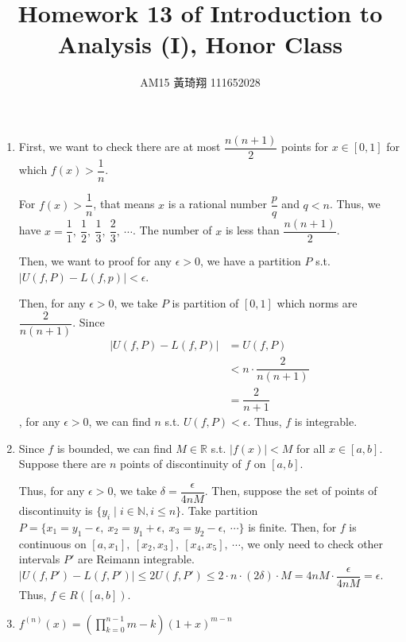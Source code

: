\documentclass[12pt]{article}
\title{Homework 13 of Introduction to Analysis (I), Honor Class}
\author{AM15 黃琦翔 111652028}
\begin{document}
\maketitle
\begin{enumerate}
    \item First, we want to check there are at most $\dfrac{n(n+1)}{2}$ points for $x\in [0, 1]$ for which $f(x) > \dfrac{1}{n}$.
    
    For $f(x) > \dfrac{1}{n}$, that means $x$ is a rational number $\dfrac{p}{q}$ and $q < n$.
    Thus, we have $x = \dfrac{1}{1},\ \dfrac{1}{2},\ \dfrac{1}{3},\ \dfrac{2}{3},\ \cdots$.
    The number of $x$ is less than $\dfrac{n(n+1)}{2}$.

    Then, we want to proof for any $\epsilon > 0$, we have a partition $P$ s.t. $|U(f, P) - L(f, p)| < \epsilon$.

    Then, for any $\epsilon > 0$, we take $P$ is partition of $[0, 1]$ which norms are $\dfrac{2}{n(n+1)}$.
    Since \begin{align*}
        |U(f, P) - L(f, P)| &= U(f, P)\\
        &< n \cdot \dfrac{2}{n(n+1)}\\
        &= \dfrac{2}{n+1}
    \end{align*}
    , for any $\epsilon > 0$, we can find $n$ s.t. $U(f, P) < \epsilon$.
    Thus, $f$ is integrable.


    \item Since $f$ is bounded, we can find $M\in \mathbb{R}$ s.t. $|f(x)| < M$ for all $x\in [a, b]$.
    Suppose there are $n$ points of discontinuity of $f$ on $[a, b]$.
    
    Thus, for any $\epsilon > 0$, we take $\delta = \dfrac{\epsilon}{4nM}$.
    Then, suppose the set of points of discontinuity is $\lbrace y_i\mid i \in \mathbb{N}, i \leq n\rbrace$.
    Take partition $P = \lbrace x_1 = y_1 - \epsilon,\ x_2 = y_1 + \epsilon,\ x_3 = y_2-\epsilon,\ \cdots\rbrace$ is finite.
    Then, for $f$ is continuous on $[a, x_1],\ [x_2, x_3],\ [x_4, x_5],\ \cdots$, 
    we only need to check other intervals $P'$ are Reimann integrable.
    $|U(f, P') - L(f, P')| \leq 2U(f, P') \leq 2\cdot n \cdot  (2\delta) \cdot M = 4nM \cdot \dfrac{\epsilon}{4nM} = \epsilon$.
    Thus, $f\in R([a, b])$.

    \item $f^{(n)}(x) = (\displaystyle\prod_{k=0}^{n-1} m-k) (1 + x)^{m-n}$
\end{enumerate}
\end{document}
